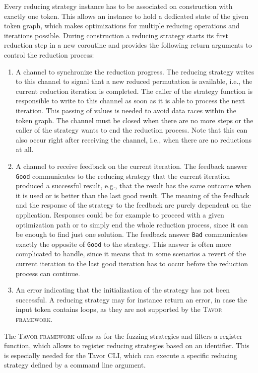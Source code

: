 Every reducing strategy instance has to be associated on construction with exactly one token. This allows an instance to hold a dedicated state of the given token graph, which makes optimizations for multiple reducing operations and iterations possible. During construction a reducing strategy starts its first reduction step in a new coroutine and provides the following return arguments to control the reduction process:

\begin{enumerate}
\item A channel to synchronize the reduction progress. The reducing strategy writes to this channel to signal that a new reduced permutation is available, i.e., the current reduction iteration is completed. The caller of the strategy function is responsible to write to this channel as soon as it is able to process the next iteration. This passing of values is needed to avoid data races within the token graph. The channel must be closed when there are no more steps or the caller of the strategy wants to end the reduction process. Note that this can also occur right after receiving the channel, i.e., when there are no reductions at all.
\item A channel to receive feedback on the current iteration. The feedback answer \texttt{Good} communicates to the reducing strategy that the current iteration produced a successful result, e.g., that the result has the same outcome when it is used or is better than the last good result. The meaning of the feedback and the response of the strategy to the feedback are purely dependent on the application. Responses could be for example to proceed with a given optimization path or to simply end the whole reduction process, since it can be enough to find just one solution. The feedback answer \texttt{Bad} communicates exactly the opposite of \texttt{Good} to the strategy. This answer is often more complicated to handle, since it means that in some scenarios a revert of the current iteration to the last good iteration has to occur before the reduction process can continue.
\item An error indicating that the initialization of the strategy has not been successful. A reducing strategy may for instance return an error, in case the input token contains loops, as they are not supported by the \textsc{Tavor framework}.
\end{enumerate}

The \textsc{Tavor framework} offers as for the fuzzing strategies and filters a register function, which allows to register reducing strategies based on an identifier. This is especially needed for the Tavor CLI, which can execute a specific reducing strategy defined by a command line argument.

